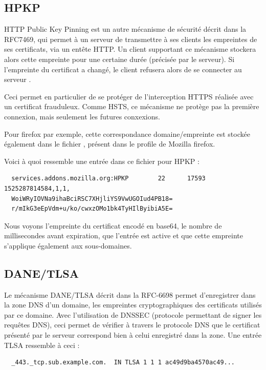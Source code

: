 \subsection{HPKP}

HTTP Public Key Pinning est un autre mécanisme de sécurité décrit dans la RFC7469, qui permet à un serveur de transmettre à ses clients les empreintes de ses certificats, via un entête HTTP. Un client supportant ce mécanisme stockera alors cette empreinte pour une certaine durée (précisée par le serveur). Si l'empreinte du certificat a changé, le client refusera alors de se connecter au serveur \cite{hpkp}.

Ceci permet en particulier de se protéger de l'interception HTTPS réalisée avec un certificat frauduleux. Comme HSTS, ce mécanisme ne protège pas la première connexion, mais seulement les futures conxexions.

Pour firefox par exemple, cette correspondance domaine/empreinte est stockée également dans le fichier , présent dans le profile de Mozilla firefox.

Voici à quoi ressemble une entrée dans ce fichier pour HPKP :

\begin{verbatim}
  services.addons.mozilla.org:HPKP        22      17593   1525287814584,1,1,
  WoiWRyIOVNa9ihaBciRSC7XHjliYS9VwUGOIud4PB18=
  r/mIkG3eEpVdm+u/ko/cwxzOMo1bk4TyHIlByibiA5E=
\end{verbatim}

Nous voyons l'empreinte du certificat encodé en base64, le nombre de millisecondes avant expiration, que l'entrée est active et que cette empreinte s'applique également aux sous-domaines.

\subsection{DANE/TLSA}

Le mécanisme DANE/TLSA décrit dans la RFC-6698 permet d'enregistrer dans la zone DNS d'un domaine, les empreintes cryptographiques des certificats utilisés par ce domaine. Avec l'utilisation de DNSSEC (protocole permettant de signer les requêtes DNS), ceci permet de vérifier à travers le protocole DNS que le certificat présenté par le serveur correspond bien à celui enregistré dans la zone. Une entrée TLSA ressemble à ceci :

\begin{verbatim}
  _443._tcp.sub.example.com.  IN TLSA 1 1 1 ac49d9ba4570ac49...
\end{verbatim}

